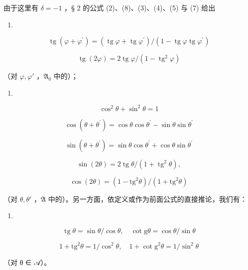 由于这里有 \(\delta = -1\) ，§ 2 的公式 (2)、(8)、(3)、(4)、(5) 与 (7) 给出

\begin{enumerate}
\def\labelenumi{(\arabic{enumi})}
\setcounter{enumi}{10}
\tightlist
\item
\end{enumerate}

\[
\operatorname{tg} \left(\varphi + \varphi^ {\prime}\right) = (\operatorname{tg} \varphi + \operatorname{tg} \varphi^ {\prime}) / (1 - \operatorname{tg} \varphi \operatorname{tg} \varphi^ {\prime})\tag{12}
\]

\[
\operatorname{tg} (2 \varphi) = 2 \operatorname{tg} \varphi / (1 - \operatorname{tg} ^ {2} \varphi)
\]

（对 \(\varphi, \varphi'\) ，\(\mathfrak{A}_0\) 中的）；

\begin{enumerate}
\def\labelenumi{(\arabic{enumi})}
\setcounter{enumi}{12}
\tightlist
\item
\end{enumerate}

\[
\cos^ {2} \theta + \sin^ {2} \theta = 1\tag{14}
\]

\[
\cos (\theta + \theta^ {\prime}) = \cos \theta \cos \theta^ {\prime} - \sin \theta \sin \theta^ {\prime}\tag{15}
\]

\[
\sin (\theta + \theta^ {\prime}) = \sin \theta \cos \theta^ {\prime} + \cos \theta \sin \theta^ {\prime}\tag{16}
\]

\[
\sin (2 \theta) = 2 \operatorname{tg} \theta / (1 + \operatorname{tg} ^ {2} \theta),
\]

\[
\cos (2 \theta) = (1 - \mathrm{tg} ^ {2} \theta) / (1 + \mathrm{tg} ^ {2} \theta)
\]

（对 \(\theta, \theta'\) ，\(\mathfrak{A}\) 中的）。另一方面，依定义或作为前面公式的直接推论，我们有：

\begin{enumerate}
\def\labelenumi{(\arabic{enumi})}
\setcounter{enumi}{16}
\tightlist
\item
\end{enumerate}

\[
\operatorname{tg} \theta = \sin \theta / \cos \theta , \quad \cot \mathrm{g} \theta = \cos \theta / \sin \theta\tag{18}
\]

\[
1 + \mathrm{tg} ^ {2} \theta = 1 / \cos^ {2} \theta , \quad 1 + \cot \mathrm{g} ^ {2} \theta = 1 / \sin^ {2} \theta
\]

（对 θ ∈ 𝒜）。

